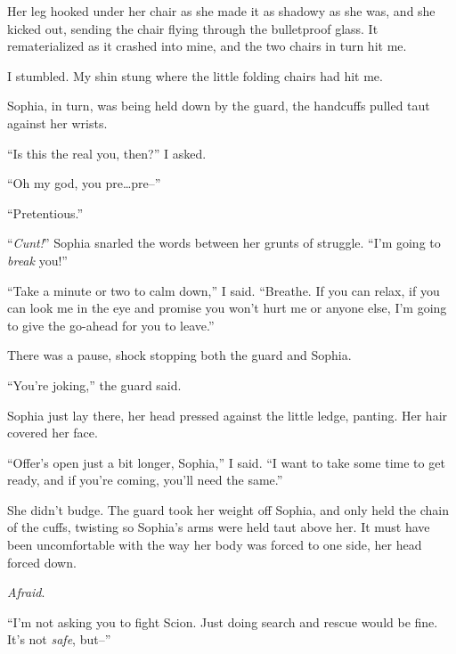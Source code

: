 Her leg hooked under her chair as she made it as shadowy as she was, and she kicked out, sending the chair flying through the bulletproof glass.  It rematerialized as it crashed into mine, and the two chairs in turn hit me.



I stumbled.  My shin stung where the little folding chairs had hit me.



Sophia, in turn, was being held down by the guard, the handcuffs pulled taut against her wrists.



``Is this the real you, then?'' I asked.



``Oh my god, you pre\ldots pre--''



``Pretentious.''



``\emph{Cunt!}''  Sophia snarled the words between her grunts of struggle.  ``I'm going to \emph{break} you!''



``Take a minute or two to calm down,'' I said.  ``Breathe.  If you can relax, if you can look me in the eye and promise you won't hurt me or anyone else, I'm going to give the go-ahead for you to leave.''



There was a pause, shock stopping both the guard and Sophia.



``You're joking,'' the guard said.



Sophia just lay there, her head pressed against the little ledge, panting.  Her hair covered her face.



``Offer's open just a bit longer, Sophia,'' I said.  ``I want to take some time to get ready, and if you're coming, you'll need the same.''



She didn't budge.  The guard took her weight off Sophia, and only held the chain of the cuffs, twisting so Sophia's arms were held taut above her.  It must have been uncomfortable with the way her body was forced to one side, her head forced down.



\emph{Afraid}.



``I'm not asking you to fight Scion.  Just doing search and rescue would be fine.  It's not \emph{safe}, but--''



